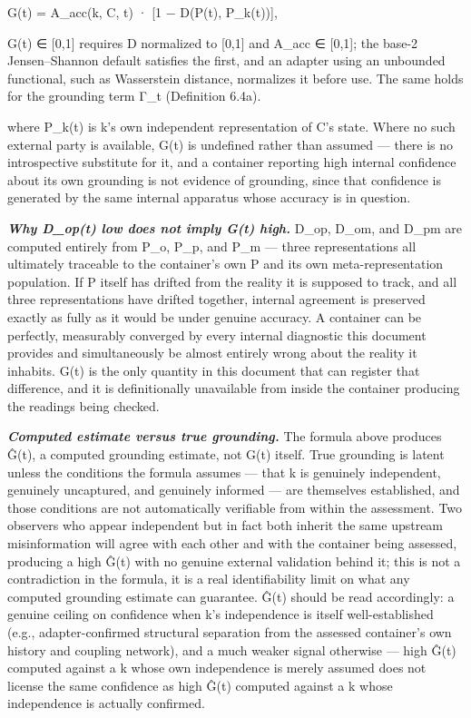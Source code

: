 \documentclass[
]{article}
\begin{document}
G(t) = A\_acc(k, C, t) · {[}1 − D(P(t), P\_k(t)){]},

G(t) ∈ {[}0,1{]} requires D normalized to {[}0,1{]} and A\_acc ∈
{[}0,1{]}; the base-2 Jensen--Shannon default satisfies the first, and
an adapter using an unbounded functional, such as Wasserstein distance,
normalizes it before use. The same holds for the grounding term Γ\_t
(Definition 6.4a).

where P\_k(t) is k's own independent representation of C's state. Where
no such external party is available, G(t) is undefined rather than
assumed --- there is no introspective substitute for it, and a container
reporting high internal confidence about its own grounding is not
evidence of grounding, since that confidence is generated by the same
internal apparatus whose accuracy is in question.

\emph{\textbf{Why D\_op(t) low does not imply G(t) high.}} D\_op, D\_om,
and D\_pm are computed entirely from P\_o, P\_p, and P\_m --- three
representations all ultimately traceable to the container's own P and
its own meta-representation population. If P itself has drifted from the
reality it is supposed to track, and all three representations have
drifted together, internal agreement is preserved exactly as fully as it
would be under genuine accuracy. A container can be perfectly,
measurably converged by every internal diagnostic this document provides
and simultaneously be almost entirely wrong about the reality it
inhabits. G(t) is the only quantity in this document that can register
that difference, and it is definitionally unavailable from inside the
container producing the readings being checked.

\emph{\textbf{Computed estimate versus true grounding.}} The formula
above produces Ĝ(t), a computed grounding estimate, not G(t) itself.
True grounding is latent unless the conditions the formula assumes ---
that k is genuinely independent, genuinely uncaptured, and genuinely
informed --- are themselves established, and those conditions are not
automatically verifiable from within the assessment. Two observers who
appear independent but in fact both inherit the same upstream
misinformation will agree with each other and with the container being
assessed, producing a high Ĝ(t) with no genuine external validation
behind it; this is not a contradiction in the formula, it is a real
identifiability limit on what any computed grounding estimate can
guarantee. Ĝ(t) should be read accordingly: a genuine ceiling on
confidence when k's independence is itself well-established (e.g.,
adapter-confirmed structural separation from the assessed container's
own history and coupling network), and a much weaker signal otherwise
--- high Ĝ(t) computed against a k whose own independence is merely
assumed does not license the same confidence as high Ĝ(t) computed
against a k whose independence is actually confirmed.
\end{document}
